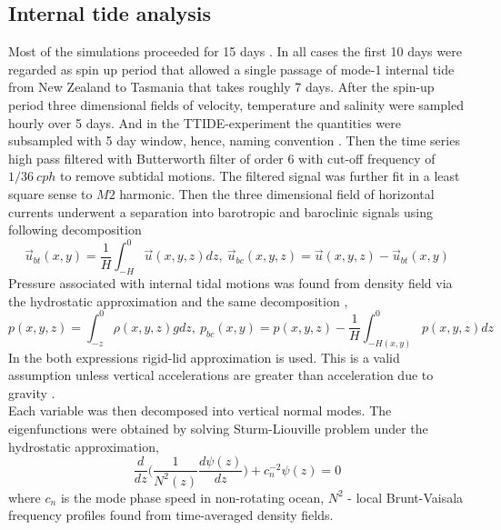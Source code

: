 \documentclass[12pt]{article}
\begin{document}
\subsection{Internal tide analysis}
\label{C3.sec:anlsys}
Most of the simulations proceeded for 15 days . In all 
cases the first 10 days were regarded as spin up period that allowed a single 
passage of mode-1 internal tide from New Zealand to Tasmania that takes roughly 7 days. After the 
spin-up period three 
dimensional fields of velocity, temperature and salinity were sampled hourly over 5 days. And in 
the TTIDE-experiment the quantities were subsampled with 5 day window, hence, naming convention 
. Then the time series high pass filtered with Butterworth filter 
of 
order $6$ with cut-off frequency of $1/36~cph$ to remove subtidal motions. The filtered signal was 
further fit in a least square sense to $M2$ harmonic. Then the three dimensional field of 
horizontal currents underwent a separation into barotropic and baroclinic signals using following 
decomposition \citep{cummins1997simulation, kunze2002internal, carter2008energetics}
\begin{equation}
\label{ch2:bt_bc_vel}
\vec{u}_{bt}(x,y) = \frac{1}{H} \int_{-H}^{0} \vec{u}(x,y,z)  dz,~\vec{u}_{bc}(x,y,z) =  
\vec{u}(x,y,z) - \vec{u}_{bt}(x,y)
\end{equation}
Pressure associated with internal tidal motions was found from density field via the  
hydrostatic approximation and the same decomposition \citep{kunze2002internal, kelly2010topo},
\begin{equation}
\label{ch2:bt_bc_pres}
p(x,y,z) = \int_{-z}^{0} \rho(x,y,z) g dz,~p_{bc}(x,y) = p(x,y,z) - \frac{1}{H} \int_{-H(x,y)}^{0} 
p(x,y,z) dz
\end{equation}
In the both expressions rigid-lid approximation is used. This is a valid assumption unless 
vertical accelerations are greater than acceleration due to gravity \citep{kelly2010topo}.\\
Each variable was then decomposed into vertical normal modes. The eigenfunctions were obtained by 
solving Sturm-Liouville problem under the hydrostatic approximation,
\begin{equation}
\label{C3.eq:sturm}
\frac{d}{dz}\Big( \frac{1}{N^2(z)}  \frac{d \psi(z)}{dz}\Big) + c^{-2}_n \psi(z) 
= 0
\end{equation}
where $c_n$ is the mode phase speed in non-rotating ocean, $N^2$ - local Brunt-Vaisala 
frequency profiles found from time-averaged density fields.\\
\end{document}
